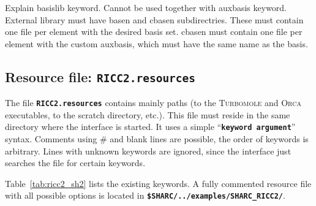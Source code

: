 \documentclass[a4paper,10pt,DIV=15,openany,twoside=false]{scrbook}
\newcommand{\todo}[1]{\textcolor{RL}{#1}}
\newcommand{\ttt}[1]{\textbf{\texttt{#1}}}
\begin{document}
\todo{Explain basislib keyword. Cannot be used together with auxbasis keyword. External library must have basen and cbasen subdirectries. These must contain one file per element with the desired basis set. cbasen must contain one file per element with the custom auxbasis, which must have the same name as the basis.}



\subsection{Resource file: \ttt{RICC2.resources}}

The file \ttt{RICC2.resources} contains mainly paths (to the \textsc{Turbomole} and \textsc{Orca} executables, to the scratch directory, etc.). This file must reside in the same directory where the interface is started. It uses a simple ``\ttt{keyword argument}'' syntax. Comments using \# and blank lines are possible, the order of keywords is arbitrary. Lines with unknown keywords are ignored, since the interface just searches the file for certain keywords.

Table~\ref{tab:ricc2_sh2} lists the existing keywords.
A fully commented resource file with all possible options is located in \ttt{\$SHARC/../examples/SHARC\_RICC2/}.
\end{document}
